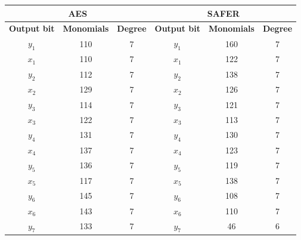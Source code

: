 \documentclass{report}
\begin{document}
\begin{table}[H]
\begin{tabular}{|c|c|c|c|c|c|}
\hline
\multicolumn{3}{|c|}{\textbf{AES}}                         & \multicolumn{3}{c|}{\textbf{SAFER}}                        \\ \hline
\textbf{Output bit} & \textbf{Monomials} & \textbf{Degree} & \textbf{Output bit} & \textbf{Monomials} & \textbf{Degree} \\ \hline
$y_1$               & 110                & 7               & $y_1$               & 160                & 7               \\ \hline
$x_1$               & 110                & 7               & $x_1$               & 122                & 7               \\ \hline
$y_2$               & 112                & 7               & $y_2$               & 138                & 7               \\ \hline
$x_2$               & 129                & 7               & $x_2$               & 126                & 7               \\ \hline
$y_3$               & 114                & 7               & $y_3$               & 121                & 7               \\ \hline
$x_3$               & 122                & 7               & $x_3$               & 113                & 7               \\ \hline
$y_4$               & 131                & 7               & $y_4$               & 130                & 7               \\ \hline
$x_4$               & 137                & 7               & $x_4$               & 123                & 7               \\ \hline
$y_5$               & 136                & 7               & $y_5$               & 119                & 7               \\ \hline
$x_5$               & 117                & 7               & $x_5$               & 138                & 7               \\ \hline
$y_6$               & 145                & 7               & $y_6$               & 108                & 7               \\ \hline
$x_6$               & 143                & 7               & $x_6$               & 110                & 7               \\ \hline
$y_7$               & 133                & 7               & $y_7$               & 46                 & 6               \\ \hline

\end{tabular}
\end{table}
\end{document}

